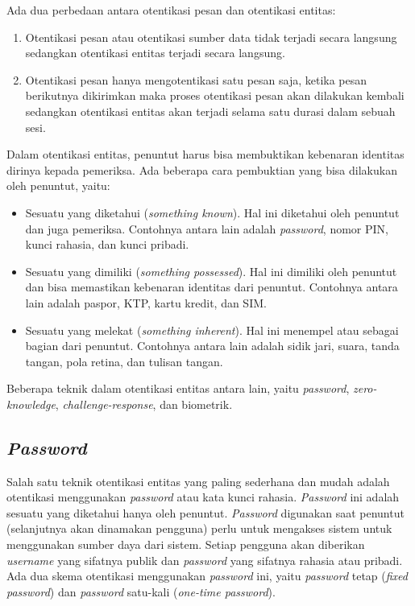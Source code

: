 Ada dua perbedaan antara otentikasi pesan dan otentikasi entitas:
\begin{enumerate}
	\item Otentikasi pesan atau otentikasi sumber data tidak terjadi secara langsung sedangkan otentikasi entitas terjadi secara langsung.
	\item Otentikasi pesan hanya mengotentikasi satu pesan saja, ketika pesan berikutnya dikirimkan maka proses otentikasi pesan akan dilakukan kembali sedangkan otentikasi entitas akan terjadi selama satu durasi dalam sebuah sesi.
\end{enumerate}

Dalam otentikasi entitas, penuntut harus bisa membuktikan kebenaran identitas dirinya kepada pemeriksa. Ada beberapa cara pembuktian yang bisa dilakukan oleh penuntut, yaitu:
\begin{itemize}
	\item Sesuatu yang diketahui (\textit{something known}). Hal ini diketahui oleh penuntut dan juga pemeriksa. Contohnya antara lain adalah \textit{password}, nomor PIN, kunci rahasia, dan kunci pribadi.
	\item Sesuatu yang dimiliki (\textit{something possessed}). Hal ini dimiliki oleh penuntut dan bisa memastikan kebenaran identitas dari penuntut. Contohnya antara lain adalah paspor, KTP, kartu kredit, dan SIM.
	\item Sesuatu yang melekat (\textit{something inherent}). Hal ini menempel atau sebagai bagian dari penuntut. Contohnya antara lain adalah sidik jari, suara, tanda tangan, pola retina, dan tulisan tangan.
\end{itemize}

\noindent Beberapa teknik dalam otentikasi entitas antara lain, yaitu \textit{password}, \textit{zero-knowledge}, \textit{challenge-response}, dan biometrik.

\subsection{\textit{Password}}
Salah satu teknik otentikasi entitas yang paling sederhana dan mudah adalah otentikasi menggunakan \textit{password} atau kata kunci rahasia. \textit{Password} ini adalah sesuatu yang diketahui hanya oleh penuntut. \textit{Password} digunakan saat penuntut (selanjutnya akan dinamakan pengguna) perlu untuk mengakses sistem untuk menggunakan sumber daya dari sistem. Setiap pengguna akan diberikan \textit{username} yang sifatnya publik dan \textit{password} yang sifatnya rahasia atau pribadi. Ada dua skema otentikasi menggunakan \textit{password} ini, yaitu \textit{password} tetap (\textit{fixed password}) dan \textit{password} satu-kali (\textit{one-time password}).


